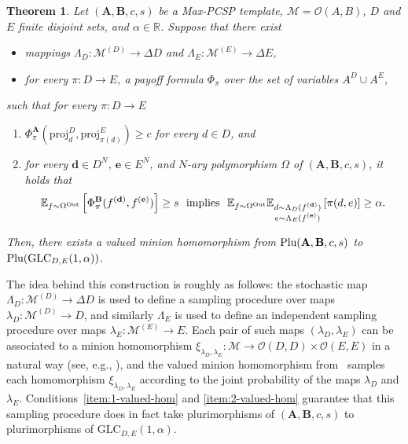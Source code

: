 \documentclass[a4paper,11pt]{article}
\newtheorem{theorem}{Theorem}[section]
\theoremstyle{definition}
\newcommand{\mnn}[1]{\mathscr{#1}}
\newcommand{\proj}[2]{\mathrm{proj}^{#1}_{#2}}
\newcommand{\ex}[1]{\mathbb{E}_{#1}}
\newcommand{\bfa}{\mathbf{A}}
\newcommand{\bfb}{\mathbf{B}}
\newcommand{\glc}{\mathrm{GLC}}
\newcommand{\abcs}{(\bfa,\bfb,c,s)}
\newcommand{\plu}{\textnormal{Plu}}
\begin{document}
\begin{theorem}\label{th:valued-hom}
   Let $\abcs$ be a Max-PCSP template, $\mnn{M} = \mathscr{O}(A,B)$, $D$ and $E$ finite disjoint sets, and $\alpha \in \mathbb{R}$. Suppose that there exist
   \begin{itemize}
      \item mappings $\Lambda_D: \mnn{M}^{(D)} \to \Delta D$ and $\Lambda_E: \mnn{M}^{(E)} \to \Delta E$,
      \item for every $\pi:D\to E$, a payoff formula $\Phi_{\pi}$ over the set of variables $A^{D} \cup A^{E}$, 
  \end{itemize}
  such that for every $\pi:D\to E$
  \begin{enumerate}[label=\textnormal{\arabic*.}]
      \item \label{item:1-valued-hom}$\Phi^{\bfa}_{\pi}(\proj{D}{d},\proj{E}{\pi(d)}) \geq c$ for every $d \in D$, and
       \item \label{item:2-valued-hom} for every $\mathbf{d}\in D^N$, $\mathbf{e}\in E^N$, and $N$-ary polymorphism $\Omega$ of $\abcs$, it holds that \[ 
       \ex{f\sim \Omega^{\textnormal{Out}}}  \left[  \Phi^{\bfb}_{\pi}(f^{(\mathbf{d})},f^{(\mathbf{e})}) \right] \geq s  \ \textnormal{ implies }  \ \ex{f\sim \Omega^{\textnormal{Out}}} \ex{\substack{d \sim \Lambda_D(f^{(\mathbf{d})})\\e\sim \Lambda_E(f^{(\mathbf{e})})}} \left[ \pi(d,e) \right] \geq \alpha.\]
  \end{enumerate}
  Then, there exists a valued minion homomorphism from $\plu\abcs$ to $\plu(\glc_{D,E}(1,\alpha))$.
\end{theorem}


The idea behind this construction is roughly as follows: the stochastic map
$\Lambda_D:\mnn{M}^{(D)}\to \Delta D$ is used to define a sampling procedure
over maps  $\lambda_D:\mnn{M}^{(D)}\to D$, and similarly $\Lambda_E$ is used to  define an independent sampling procedure over maps $\lambda_E:\mnn{M}^{(E)}\to E$. Each pair of such maps $(\lambda_D,\lambda_E)$ can be associated to a minion homomorphism $\xi_{\lambda_D,\lambda_E}:\mnn{M} \to \mathscr{O}(D,D) \times \mathscr{O}(E,E)$ in a natural way (see, e.g., \cite[Lemma 4.4]{BBKO21}), and the valued minion homomorphism from~ samples each homomorphism $\xi_{\lambda_D,\lambda_E}$ according to the joint probability of the maps $\lambda_D$ and $\lambda_E$. Conditions~\ref{item:1-valued-hom} and \ref{item:2-valued-hom} guarantee that this sampling procedure does in fact take plurimorphisms of $\abcs$ to plurimorphisms of $\glc_{D,E}(1,\alpha)$.
\end{document}
